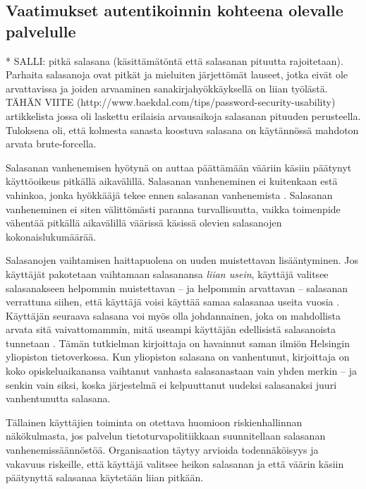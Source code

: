 \documentclass[english,gradu]{tktltiki}
\begin{document}


\subsection{Vaatimukset autentikoinnin kohteena olevalle palvelulle} %
\label{sub:vaatimukset_autentikoinnin_kohteena_olevalle_palvelulle}

* SALLI: pitkä salasana (käsittämätöntä että salasanan pituutta rajoitetaan). Parhaita salasanoja ovat pitkät ja mieluiten järjettömät lauseet, jotka eivät ole arvattavissa ja joiden arvaaminen sanakirjahyökkäyksellä on liian työlästä. TÄHÄN VIITE (http://www.baekdal.com/tips/password-security-usability) artikkelista jossa oli laskettu erilaisia arvausaikoja salasanan pituuden perusteella. Tuloksena oli, että kolmesta sanasta koostuva salasana on käytännössä mahdoton arvata brute-forcella.

Salasanan vanhenemisen hyötynä on auttaa päättämään vääriin käsiin päätynyt käyttöoikeus pitkällä aikavälillä. Salasanan vanheneminen ei kuitenkaan estä vahinkoa, jonka hyökkääjä tekee ennen salasanan vanhenemista \cite{lopsa_pw_expiry_06}. Salasanan vanheneminen ei siten välittömästi paranna turvallisuutta, vaikka toimenpide vähentää pitkällä aikavälillä väärissä käsissä olevien salasanojen kokonaislukumäärää.

Salasanojen vaihtamisen haittapuolena on uuden muistettavan lisääntyminen. Jos käyttäjät pakotetaan vaihtamaan salasanansa \emph{liian usein}, käyttäjä valitsee salasanakseen helpommin muistettavan -- ja helpommin arvattavan -- salasanan verrattuna siihen, että käyttäjä voisi käyttää samaa salasanaa useita vuosia \cite{schneier_changing_passwords_10}. Käyttäjän seuraava salasana voi myös olla johdannainen, joka on mahdollista arvata sitä vaivattomammin, mitä useampi käyttäjän edellisistä salasanoista tunnetaan \cite{password_expiration_10}. Tämän tutkielman kirjoittaja on havainnut saman ilmiön Helsingin yliopiston tietoverkossa. Kun yliopiston salasana on vanhentunut, kirjoittaja on koko opiskeluaikanansa vaihtanut vanhasta salasanastaan vain yhden merkin -- ja senkin vain siksi, koska järjestelmä ei kelpuuttanut uudeksi salasanaksi juuri vanhentunutta salasana.

Tällainen käyttäjien toiminta on otettava huomioon riskienhallinnan näkökulmasta, jos palvelun tietoturvapolitiikkaan suunnitellaan salasanan vanhenemissäännöstöä. Organisaation täytyy arvioida todennäköisyys ja vakavuus riskeille, että käyttäjä valitsee heikon salasanan ja että väärin käsiin päätynyttä salasanaa käytetään liian pitkään.
\end{document}
